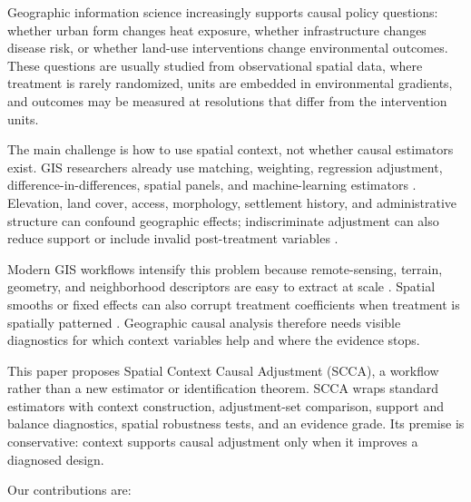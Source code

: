 \documentclass{article}
\begin{document}
Geographic information science increasingly supports causal policy questions: whether urban form changes heat exposure, whether infrastructure changes disease risk, or whether land-use interventions change environmental outcomes. These questions are usually studied from observational spatial data, where treatment is rarely randomized, units are embedded in environmental gradients, and outcomes may be measured at resolutions that differ from the intervention units.

The main challenge is how to use spatial context, not whether causal estimators exist. GIS researchers already use matching, weighting, regression adjustment, difference-in-differences, spatial panels, and machine-learning estimators \citep{stuart2010matching, angrist2009mostly, athey2019estimating, hernan2020whatif}. Elevation, land cover, access, morphology, settlement history, and administrative structure can confound geographic effects; indiscriminate adjustment can also reduce support or include invalid post-treatment variables \citep{reich2021review,gilbert2021spatialconfounding,hodges2010adding,paciorek2010importance,dupont2022spatial+,khan2022restricted}.

Modern GIS workflows intensify this problem because remote-sensing, terrain, geometry, and neighborhood descriptors are easy to extract at scale \citep{anselin2014modern,brunsdon2016quantitative}. Spatial smooths or fixed effects can also corrupt treatment coefficients when treatment is spatially patterned \citep{hodges2010adding,dupont2022spatial+,tec2023spatialdml}. Geographic causal analysis therefore needs visible diagnostics for which context variables help and where the evidence stops.

This paper proposes Spatial Context Causal Adjustment (SCCA), a workflow rather than a new estimator or identification theorem. SCCA wraps standard estimators with context construction, adjustment-set comparison, support and balance diagnostics, spatial robustness tests, and an evidence grade. Its premise is conservative: context supports causal adjustment only when it improves a diagnosed design.

Our contributions are:
\end{document}
